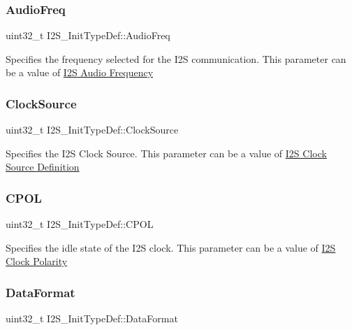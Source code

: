 \subsubsection{\texorpdfstring{Audio\+Freq}{AudioFreq}}
{\footnotesize\ttfamily uint32\+\_\+t I2\+S\+\_\+\+Init\+Type\+Def\+::\+Audio\+Freq}

Specifies the frequency selected for the I2S communication. This parameter can be a value of \hyperlink{group___i2_s___audio___frequency}{I2S Audio Frequency} \mbox{\label{struct_i2_s___init_type_def_a6a0c9c91b9530465cc2347c758a2fdf3}} 
\subsubsection{\texorpdfstring{Clock\+Source}{ClockSource}}
{\footnotesize\ttfamily uint32\+\_\+t I2\+S\+\_\+\+Init\+Type\+Def\+::\+Clock\+Source}

Specifies the I2S Clock Source. This parameter can be a value of \hyperlink{group___i2_s___clock___source}{I2S Clock Source Definition} \mbox{\label{struct_i2_s___init_type_def_aff339ae5b4099da49e6970dd59c41afe}} 
\subsubsection{\texorpdfstring{C\+P\+OL}{CPOL}}
{\footnotesize\ttfamily uint32\+\_\+t I2\+S\+\_\+\+Init\+Type\+Def\+::\+C\+P\+OL}

Specifies the idle state of the I2S clock. This parameter can be a value of \hyperlink{group___i2_s___clock___polarity}{I2S Clock Polarity} \mbox{\label{struct_i2_s___init_type_def_aa968e67a06e23282776bd7b615a8c1cc}} 
\subsubsection{\texorpdfstring{Data\+Format}{DataFormat}}
{\footnotesize\ttfamily uint32\+\_\+t I2\+S\+\_\+\+Init\+Type\+Def\+::\+Data\+Format}

